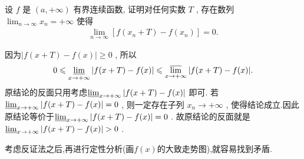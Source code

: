 \documentclass[../../main.tex]{subfiles}%
\begin{document}
\begin{example}
设 \(f\) 是 \((a, +\infty)\) 有界连续函数, 证明对任何实数 \(T\) , 存在数列 \(\lim_{n \to \infty} x_n = +\infty\) 使得
\begin{align*}
\lim_{n \to \infty} [f(x_n + T) - f(x_n)] = 0.
\end{align*}
\end{example}
\begin{remark}
因为\(\vert f(x + T) - f(x)\vert \geqslant 0\) , 所以
\begin{align*}
0\leqslant \varliminf_{x \to +\infty} \vert f(x + T) - f(x)\vert \leqslant \varlimsup_{x \to +\infty} \vert f(x + T) - f(x)\vert.
\end{align*}
原结论的反面只用考虑\(\varliminf_{x \to +\infty} \vert f(x + T) - f(x)\vert\) 即可. 若\(\varliminf_{x \to +\infty} \vert f(x + T) - f(x)\vert = 0\) , 则一定存在子列 \(x_n \to +\infty\) , 使得结论成立.因此原结论等价于\(\varliminf_{x \to +\infty} \vert f(x + T) - f(x)\vert = 0\) .
故原结论的反面就是\(\varliminf_{x \to +\infty} \vert f(x + T) - f(x)\vert > 0\) .
\end{remark}
\begin{note}
考虑反证法之后,再进行定性分析(画$f(x)$的大致走势图),就容易找到矛盾.
\end{note}
\end{document}
